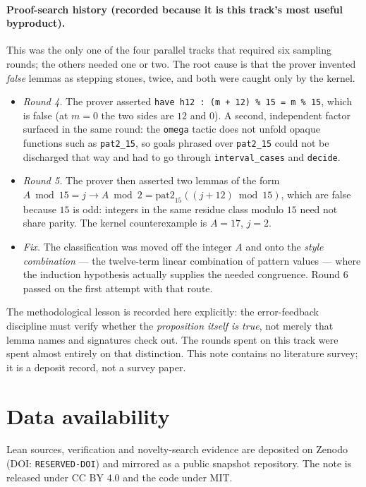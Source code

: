 \documentclass[11pt]{article}
\begin{document}
\paragraph{Proof-search history (recorded because it is this track's most useful byproduct).}
This was the only one of the four parallel tracks that required six sampling rounds; the
others needed one or two. The root cause is that the prover invented \emph{false} lemmas as
stepping stones, twice, and both were caught only by the kernel.
\begin{itemize}
\item \emph{Round 4.} The prover asserted \texttt{have h12 : (m + 12) \% 15 = m \% 15},
which is false (at $m=0$ the two sides are $12$ and $0$). A second, independent factor
surfaced in the same round: the \texttt{omega} tactic does not unfold opaque functions such
as \texttt{pat2\_15}, so goals phrased over \texttt{pat2\_15} could not be discharged that
way and had to go through \texttt{interval\_cases} and \texttt{decide}.
\item \emph{Round 5.} The prover then asserted two lemmas of the form
$A \bmod 15 = j \to A \bmod 2 = \mathrm{pat2}_{15}((j+12) \bmod 15)$, which are false because
$15$ is odd: integers in the same residue class modulo $15$ need not share parity. The kernel
counterexample is $A=17$, $j=2$.
\item \emph{Fix.} The classification was moved off the integer $A$ and onto the
\emph{style combination} --- the twelve-term linear combination of pattern values --- where
the induction hypothesis actually supplies the needed congruence. Round 6 passed on the first
attempt with that route.
\end{itemize}
The methodological lesson is recorded here explicitly: the error-feedback discipline must
verify whether the \emph{proposition itself is true}, not merely that lemma names and
signatures check out. The rounds spent on this track were spent almost entirely on that
distinction.
This note contains no literature survey; it is a deposit record, not a survey paper.

\section*{Data availability}
Lean sources, verification and novelty-search evidence are deposited on Zenodo
(DOI: \texttt{RESERVED-DOI}) and mirrored as a public snapshot repository. The note is
released under CC BY 4.0 and the code under MIT.
\end{document}
